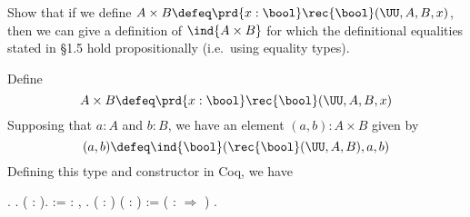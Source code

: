 Show that if we define $A \times B \defeq \prd{x : \bool}
    \rec{\bool}(\UU, A, B, x)$, then we can give a definition of $\ind{A \times
    B}$ for which the definitional equalities stated in \S1.5 hold
    propositionally (i.e.~using equality types). 

 \soln 
Define
\[
  A \times B \defeq \prd{x : \bool} \rec{\bool}(\UU, A, B, x)
\]
Supposing that $a : A$ and $b : B$, we have an element $(a, b) : A \times B$
given by
\[
  (a, b) \defeq \ind{\bool}(\rec{\bool}(\UU, A, B), a, b)
\]
Defining this type and constructor in Coq, we have \begin{coqdoccode}
\coqdocemptyline
\coqdocnoindent
{} .\coqdoceol
\coqdocnoindent
{} .\coqdoceol
\coqdocnoindent
{} (  : ).\coqdoceol
\coqdocemptyline
\coqdocnoindent
{}  := \coqdockw{\ensuremath{\forall}}  : ,      .\coqdoceol
\coqdocemptyline
\coqdocnoindent
{}  ( : ) ( : ) \coqdoceol
\coqdocindent{1.00em}
:=  (  :  \ensuremath{\Rightarrow}      )  .\coqdoceol
\coqdocemptyline
\end{coqdoccode}


